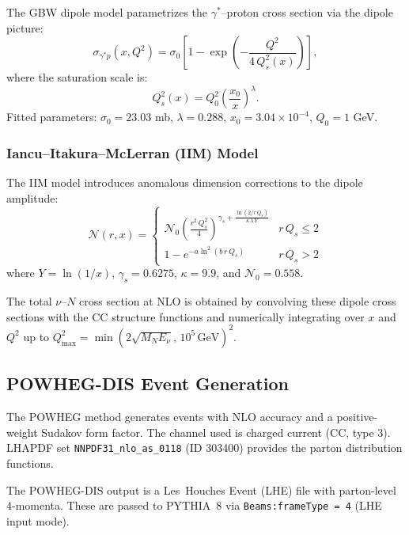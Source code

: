 \documentclass[11pt,a4paper]{article}
\begin{document}
The GBW dipole model \cite{GBW1998, GBW1999} parametrizes the $\gamma^*$--proton cross section via the dipole picture:
\begin{equation}
  \sigma_{\gamma^*p}(x, Q^2) = \sigma_0 \left[1 - \exp\!\left(-\frac{Q^2}{4\,Q_s^2(x)}\right)\right],
  \label{eq:gbw}
\end{equation}
where the saturation scale is:
\begin{equation}
  Q_s^2(x) = Q_0^2 \left(\frac{x_0}{x}\right)^\lambda.
\end{equation}
Fitted parameters: $\sigma_0 = 23.03$ mb, $\lambda = 0.288$, $x_0 = 3.04\times10^{-4}$, $Q_0 = 1$ GeV.

\subsubsection{Iancu--Itakura--McLerran (IIM) Model}

The IIM model \cite{IIM2002} introduces anomalous dimension corrections to the dipole amplitude:
\begin{equation}
  \mathcal{N}(r, x) =
  \begin{cases}
    \mathcal{N}_0 \left(\frac{r^2\,Q_s^2}{4}\right)^{\gamma_s + \frac{\ln(2/r\,Q_s)}{\kappa\,\lambda\,Y}} & r\,Q_s \le 2 \\
    1 - e^{-a\ln^2(b\,r\,Q_s)} & r\,Q_s > 2
  \end{cases}
  \label{eq:iim}
\end{equation}
where $Y = \ln(1/x)$, $\gamma_s = 0.6275$, $\kappa = 9.9$, and $\mathcal{N}_0 = 0.558$.

The total $\nu$--$N$ cross section at NLO is obtained by convolving these dipole cross sections with the CC structure functions and numerically integrating over $x$ and $Q^2$ up to $Q_\mathrm{max}^2 = \min(2\sqrt{M_N E_\nu},\,10^5\,\mathrm{GeV})^2$.

\subsection{POWHEG-DIS Event Generation}

The POWHEG method \cite{Nason2004, Frixione2007} generates events with NLO accuracy and a positive-weight Sudakov form factor. The channel used is charged current (CC, type 3). LHAPDF set \texttt{NNPDF31\_nlo\_as\_0118} (ID 303400) \cite{NNPDF2017} provides the parton distribution functions.

The POWHEG-DIS output is a Les~Houches Event (LHE) file with parton-level 4-momenta. These are passed to PYTHIA~8 via \texttt{Beams:frameType~=~4} (LHE input mode).
\end{document}
